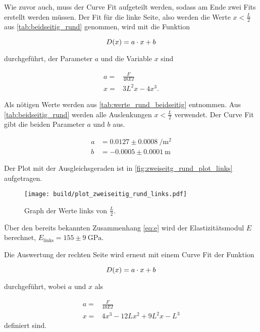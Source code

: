 Wie zuvor auch, muss der Curve Fit aufgeteilt werden, sodass am Ende zwei Fits erstellt werden müssen.
Der Fit für die linke Seite, also werden die Werte $x < \frac{L}{2}$ aus \autoref{tab:beidseitig_rund} genommen, wird mit die Funktion

\begin{equation}
    D(x) = a \cdot x + b \\
    \label{eq:durchbiegung_beidseitig1}
\end{equation}

durchgeführt, der Parameter $a$ und die Variable $x$ sind

\begin{align}
    a =& \frac{F}{48EI} \\
    x =& 3L^2x - 4x^3.
\end{align}

Als nötigen Werte werden aus \autoref{tab:werte_rund_beidseitig} entnommen.
Aus \autoref{tab:beidseitig_rund} werden alle Auslenkungen $x < \frac{L}{2}$ verwendet.
Der Curve Fit gibt die beiden Parameter $a$ und $b$ aus.

\begin{align}
    a &= 0.0127 \pm \SI{0.0008}{\per \meter\squared}\\
    b &= -0.0005 \pm \SI{0.0001}{\meter}
\end{align}

Der Plot mit der Ausgleichsgeraden ist in \autoref{fig:zweiseitg_rund_plot_links} aufgetragen.

\begin{figure}
    \centering
    \texttt{[image: build/plot\_zweiseitig\_rund\_links.pdf]}
    \caption{Graph der Werte links von $\frac{L}{2}$.}
    \label{fig:zweiseitg_rund_plot_links}
\end{figure}

Über den bereits bekannten Zusammenhang \autoref{eq:e} wird der Elastizitätsmodul $E$ berechnet, $E_\text{links} = 155 \pm \SI{9}{\giga\pascal}$.

Die Auswertung der rechten Seite wird erneut mit einem Curve Fit der Funktion

\begin{equation}
    D(x) = a \cdot x + b \\
    \label{eq:durchbiegung_beidseitig2}
\end{equation} 

durchgeführt, wobei $a$ und $x$ als  

\begin{align}
    a =& \frac{F}{48EI} \\
    x =& 4x^3 - 12Lx^2 + 9L^2x - L^3
\end{align}
definiert sind.

